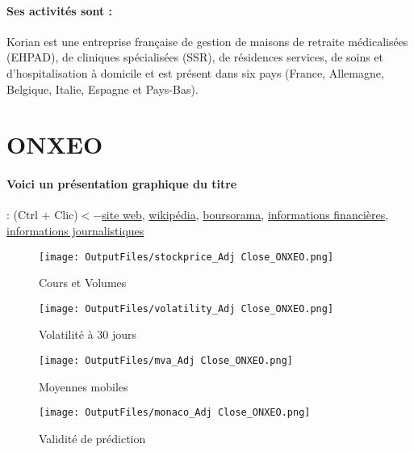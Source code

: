\documentclass[11pt,a4paper]{report}%
\begin{document}
\paragraph{Ses activités sont : } Korian est une entreprise française de gestion de maisons de retraite médicalisées (EHPAD), de cliniques spécialisées (SSR), de résidences services, de soins et d’hospitalisation à domicile et est présent dans six pays (France, Allemagne, Belgique, Italie, Espagne et Pays-Bas).  
    
    \newpage

\section{ONXEO}

\paragraph{Voici un présentation graphique du titre} : (Ctrl + Clic)$<-$\href{https://www.onxeo.com/fr/investisseurs/}{site web}, \href{https://fr.wikipedia.org/wiki/Onxeo}{wikipédia}, \href{https://www.boursorama.com/cours/1rPONXEO}{boursorama}, \href{https://www.qwant.com/?q=site:https:%2f%2fwww.easybourse.com%2faction-societe%2fONXEO&t=web&client=ext-firefox-hp}{informations financières}, \href{https://bourse.lerevenu.com/cours-de-bourse/fiche-valeur-synthese/ONXEO/ONXEO-FR}{informations journalistiques}
\begin{figure}[!htb]
   \begin{minipage}{0.5\textwidth}
     \centering
     \texttt{[image: OutputFiles/stockprice\_Adj Close\_ONXEO.png]}
     \caption{Cours et Volumes}\label{Fig:price_ONXEO}
   \end{minipage}\hfill
   \begin{minipage}{0.5\textwidth}
     \centering
     \texttt{[image: OutputFiles/volatility\_Adj Close\_ONXEO.png]}
     \caption{Volatilité à 30 jours}\label{Fig:volat_ONXEO}
   \end{minipage}
\end{figure}
\begin{figure}[!htb]
   \begin{minipage}{0.5\textwidth}
     \centering
     \texttt{[image: OutputFiles/mva\_Adj Close\_ONXEO.png]}
     \caption{Moyennes mobiles}\label{Fig:mva_ONXEO}
   \end{minipage}\hfill
   \begin{minipage}{0.5\textwidth}
     \centering
     \texttt{[image: OutputFiles/monaco\_Adj Close\_ONXEO.png]}
     \caption{Validité de prédiction}\label{Fig:prediction_ONXEO}
   \end{minipage}
\end{figure}
\end{document}
